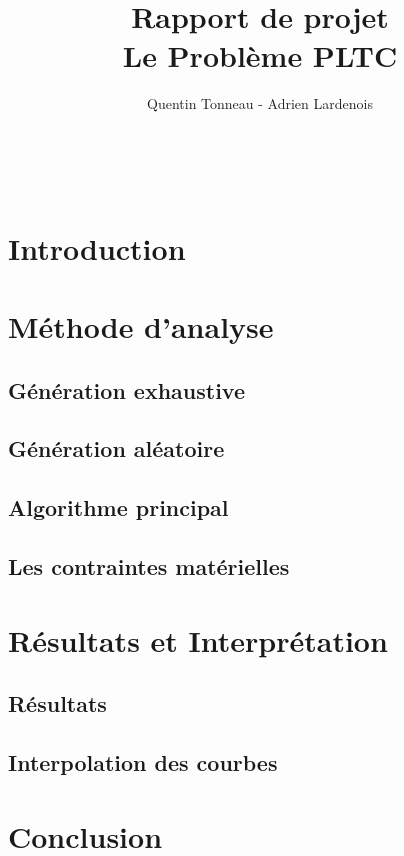 \documentclass[a4paper,11pt,twoside]{report}
\title {Rapport de projet \\ Le Problème PLTC}
\author {Quentin Tonneau - Adrien Lardenois}
\date{}
\begin{document}
\pagestyle{plain}
\renewcommand\labelitemi{$\circ$}
\renewcommand\labelitemii{$\bullet$}
\tableofcontents
\newpage
\thispagestyle{empty} ~

{

	\fancyhead{}
	\fancyfoot{}
	\lfoot[\thepage]{}
	\rfoot[]{\thepage}
}

\chapter{Introduction}



 
\chapter{Méthode d'analyse}
   \section{Génération exhaustive}
      
   \section{Génération aléatoire}
      
   \section{Algorithme principal}
      
   \section{Les contraintes matérielles}
      
\chapter{Résultats et Interprétation}
  \section{Résultats}
      
   \newpage
  \section{Interpolation des courbes}
      
\chapter{Conclusion}
      
\end{document}
